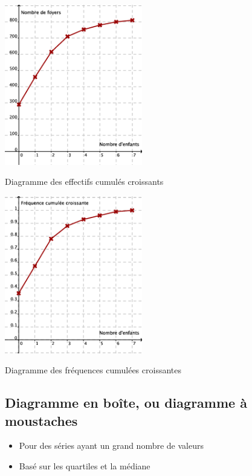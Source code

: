\begin{multicols}{2}
  \begin{center}
    \includegraphics[width=6cm]{Stats_Fig4_DiagEffCum}
    
    Diagramme des effectifs cumulés croissants    
  \end{center}

  \columnbreak
  \begin{center}
    \includegraphics[width=6cm]{Stats_Fig4_DiagFreqCum}

    Diagramme des fréquences cumulées croissantes
  \end{center}
\end{multicols}



\subsection{Diagramme en boîte, ou diagramme à moustaches}

\begin{itemize}
\item Pour des séries ayant un grand nombre de valeurs
\item Basé sur les quartiles et la médiane
\end{itemize}

